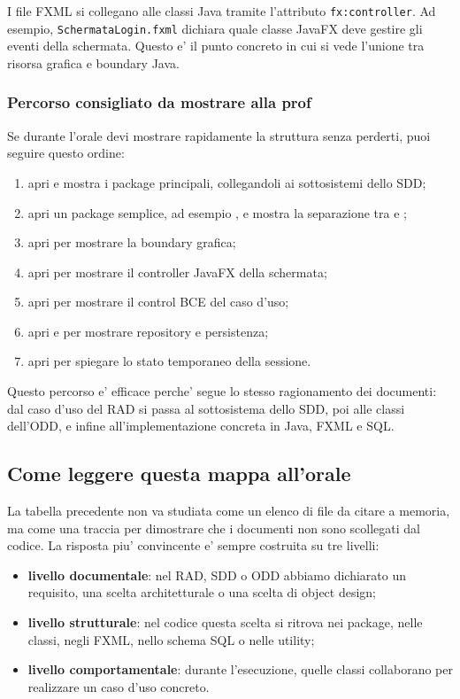 ﻿\documentclass[11pt,a4paper]{article}
\newcommand{\term}[1]{\textbf{#1}}
\begin{document}
I file FXML si collegano alle classi Java tramite l'attributo \texttt{fx:controller}. Ad
esempio, \texttt{SchermataLogin.fxml} dichiara quale classe JavaFX deve gestire gli eventi
della schermata. Questo e' il punto concreto in cui si vede l'unione tra risorsa grafica e
boundary Java.

\subsubsection{Percorso consigliato da mostrare alla prof}

Se durante l'orale devi mostrare rapidamente la struttura senza perderti, puoi seguire
questo ordine:
\begin{enumerate}
  \item apri  e mostra i package principali, collegandoli ai
  sottosistemi dello SDD;
  \item apri un package semplice, ad esempio , e mostra la
  separazione tra  e ;
  \item apri  per mostrare la boundary
  grafica;
  \item apri  per mostrare il controller JavaFX della schermata;
  \item apri  per mostrare il control BCE del caso d'uso;
  \item apri  e  per mostrare repository e
  persistenza;
  \item apri  per spiegare lo stato temporaneo della sessione.
\end{enumerate}

Questo percorso e' efficace perche' segue lo stesso ragionamento dei documenti: dal caso
d'uso del RAD si passa al sottosistema dello SDD, poi alle classi dell'ODD, e infine
all'implementazione concreta in Java, FXML e SQL.

\subsection{Come leggere questa mappa all'orale}

La tabella precedente non va studiata come un elenco di file da citare a memoria, ma come
una traccia per dimostrare che i documenti non sono scollegati dal codice. La risposta
piu' convincente e' sempre costruita su tre livelli:
\begin{itemize}
  \item \term{livello documentale}: nel RAD, SDD o ODD abbiamo dichiarato un requisito,
  una scelta architetturale o una scelta di object design;
  \item \term{livello strutturale}: nel codice questa scelta si ritrova nei package, nelle
  classi, negli FXML, nello schema SQL o nelle utility;
  \item \term{livello comportamentale}: durante l'esecuzione, quelle classi collaborano
  per realizzare un caso d'uso concreto.
\end{itemize}
\end{document}
